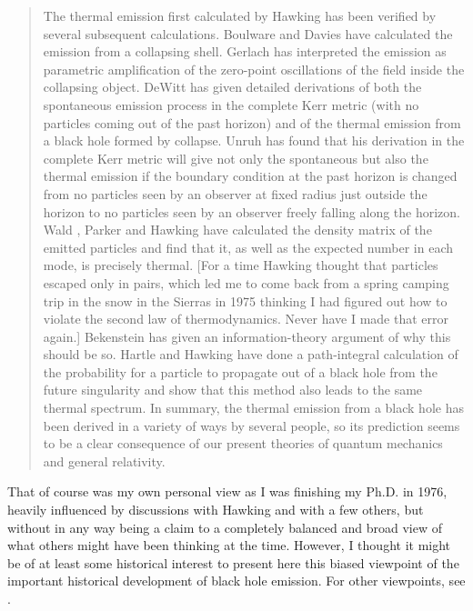 \documentclass[12pt]{article} \usepackage{latexsym}
\begin{document}
\begin{quotation}
The thermal emission first calculated by Hawking has been verified by
several subsequent calculations.  Boulware \cite{Boul} and Davies
\cite{Dav} have calculated the emission from a collapsing shell.
Gerlach \cite{Ger} has interpreted the emission as parametric
amplification of the zero-point oscillations of the field inside the
collapsing object.  DeWitt \cite{DeW} has given detailed derivations
of both the spontaneous emission process in the complete Kerr metric
(with no particles coming out of the past horizon) and of the thermal
emission from a black hole formed by collapse.  Unruh \cite{Unruh75}
has found that his derivation in the complete Kerr metric will give
not only the spontaneous but also the thermal emission if the boundary
condition at the past horizon is changed from no particles seen by an
observer at fixed radius just outside the horizon to no particles seen
by an observer freely falling along the horizon.  Wald \cite{Wald75},
Parker \cite{Park} and Hawking \cite{Haw3} have calculated the density
matrix of the emitted particles and find that it, as well as the
expected number in each mode, is precisely thermal.  [For a time
Hawking thought that particles escaped only in pairs, which led me to
come back from a spring camping trip in the snow in the Sierras in
1975 thinking I had figured out how to violate the second law of
thermodynamics.  Never have I made that error again.]  Bekenstein
\cite{Bek5a} has given an information-theory argument of why this
should be so.  Hartle and Hawking \cite{HH} have done a path-integral
calculation of the probability for a particle to propagate out of a
black hole from the future singularity and show that this method also
leads to the same thermal spectrum.  In summary, the thermal emission
from a black hole has been derived in a variety of ways by several
people, so its prediction seems to be a clear consequence of our
present theories of quantum mechanics and general relativity.

\end{quotation}

That of course was my own personal view as I was finishing my Ph.D. in
1976, heavily influenced by discussions with Hawking and with a few
others, but without in any way being a claim to a completely balanced
and broad view of what others might have been thinking at the time.
However, I thought it might be of at least some historical interest to
present here this biased viewpoint of the important historical
development of black hole emission.  For other viewpoints, see
\cite{Hawreview,Bekreview,Wheeler}.
\end{document}
